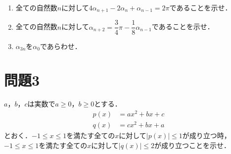 \documentclass[unicode,12pt, A4j]{ltjsarticle}%
\begin{document}
\begin{enumerate}
 \item 全ての自然数$n$に対して$4\alpha_{n+1}-2\alpha_n+\alpha_{n-1}=2\pi$であることを示せ．
 \item 全ての自然数$n$に対して$\alpha_{n+2}=\dfrac{3}{4}\pi-\dfrac{1}{8}\alpha_{n-1}$であることを示せ．
 \item $\alpha_{3n}$を$\alpha_0$であらわせ．
\end{enumerate}

\section{問題3}
$a$，$b$，$c$は実数で$a\ge 0$，$b\ge 0$とする．
\begin{align*}
 p(x)&=ax^2+bx+c \\
 q(x)&=cx^2+bx+a
\end{align*}
とおく．$-1\le x\le 1$を満たす全ての$x$に対して$|p(x)|\le 1$が成り立つ時，$-1\le x\le 1$を満たす全ての$x$に対して$|q(x)|\le 2$が成り立つことを示せ．
\end{document}
